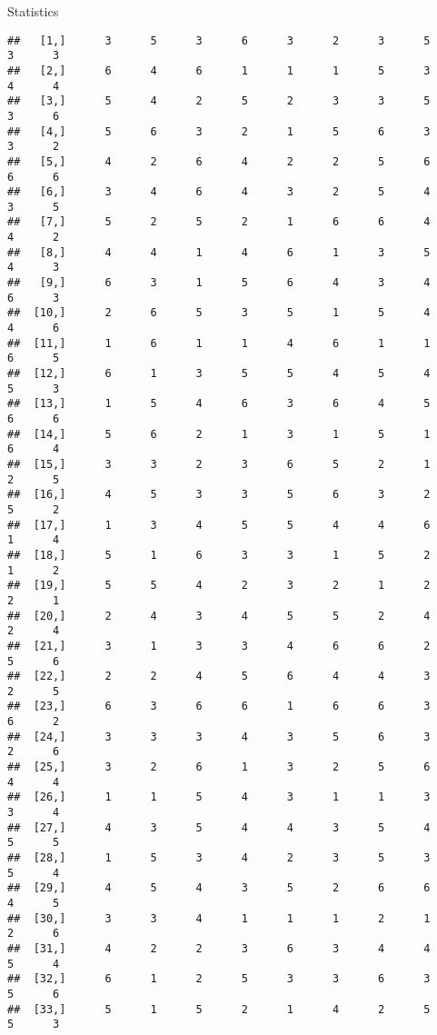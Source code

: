\documentclass[
  ignorenonframetext,
]{beamer}
\begin{document}
\begin{frame}[fragile]{Statistics}
\begin{verbatim}
##   [1,]      3      5      3      6      3      2      3      5      3      3
##   [2,]      6      4      6      1      1      1      5      3      4      4
##   [3,]      5      4      2      5      2      3      3      5      3      6
##   [4,]      5      6      3      2      1      5      6      3      3      2
##   [5,]      4      2      6      4      2      2      5      6      6      6
##   [6,]      3      4      6      4      3      2      5      4      3      5
##   [7,]      5      2      5      2      1      6      6      4      4      2
##   [8,]      4      4      1      4      6      1      3      5      4      3
##   [9,]      6      3      1      5      6      4      3      4      6      3
##  [10,]      2      6      5      3      5      1      5      4      4      6
##  [11,]      1      6      1      1      4      6      1      1      6      5
##  [12,]      6      1      3      5      5      4      5      4      5      3
##  [13,]      1      5      4      6      3      6      4      5      6      6
##  [14,]      5      6      2      1      3      1      5      1      6      4
##  [15,]      3      3      2      3      6      5      2      1      2      5
##  [16,]      4      5      3      3      5      6      3      2      5      2
##  [17,]      1      3      4      5      5      4      4      6      1      4
##  [18,]      5      1      6      3      3      1      5      2      1      2
##  [19,]      5      5      4      2      3      2      1      2      2      1
##  [20,]      2      4      3      4      5      5      2      4      2      4
##  [21,]      3      1      3      3      4      6      6      2      5      6
##  [22,]      2      2      4      5      6      4      4      3      2      5
##  [23,]      6      3      6      6      1      6      6      3      6      2
##  [24,]      3      3      3      4      3      5      6      3      2      6
##  [25,]      3      2      6      1      3      2      5      6      4      4
##  [26,]      1      1      5      4      3      1      1      3      3      4
##  [27,]      4      3      5      4      4      3      5      4      5      5
##  [28,]      1      5      3      4      2      3      5      3      5      4
##  [29,]      4      5      4      3      5      2      6      6      4      5
##  [30,]      3      3      4      1      1      1      2      1      2      6
##  [31,]      4      2      2      3      6      3      4      4      5      4
##  [32,]      6      1      2      5      3      3      6      3      5      6
##  [33,]      5      1      5      2      1      4      2      5      5      3

\end{verbatim}
\end{frame}
\end{document}
